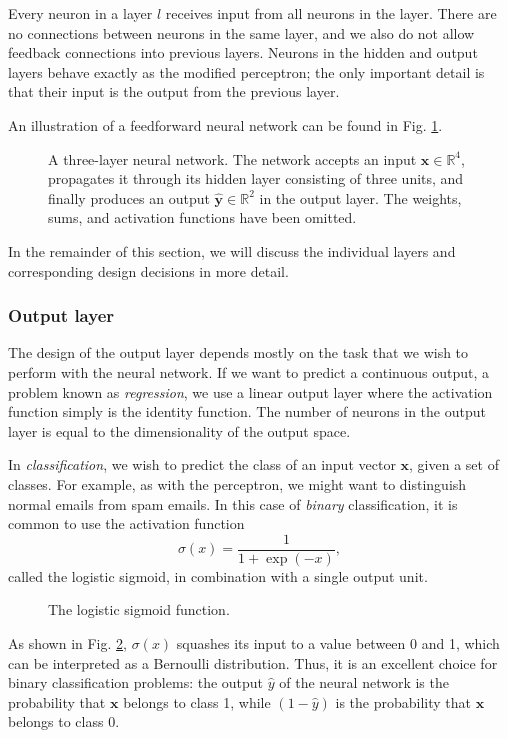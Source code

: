 Every neuron in a layer $l$ receives input from all neurons in the  layer. There are no connections between neurons in the same layer, and we also do not allow feedback connections into previous layers. Neurons in the hidden and output layers behave exactly as the modified perceptron; the only important detail is that their input is the output from the previous layer.

An illustration of a feedforward neural network can be found in Fig. \ref{fig:network}.
\begin{figure}
	\begin{center}
		
	\end{center}
	\caption{A three-layer neural network. The network accepts an input $\bm{x} \in \mathbb{R}^4$, propagates it through its hidden layer consisting of three units, and finally produces an output $\hat{\bm{y}} \in \mathbb{R}^2$ in the output layer. The weights, sums, and activation functions have been omitted.}
	\label{fig:network}
\end{figure}

In the remainder of this section, we will discuss the individual layers and corresponding design decisions in more detail.

\subsubsection{Output layer}
The design of the output layer depends mostly on the task that we wish to perform with the neural network. If we want to predict a continuous output, a problem known as \emph{regression}, we use a linear output layer where the activation function simply is the identity function. The number of neurons in the output layer is equal to the dimensionality of the output space.

In \emph{classification}, we wish to predict the class of an input vector $\bm{x}$, given a set of classes. For example, as with the perceptron, we might want to distinguish normal emails from spam emails. In this case of \emph{binary} classification, it is common to use the activation function
\begin{equation}
\sigma(x) = \frac1{1+\exp(-x)},
\end{equation}
called the logistic sigmoid, in combination with a single output unit.
\begin{figure}
	\begin{center}
		
	\end{center}
	\caption{The logistic sigmoid function.}
	\label{fig:sigmoid}
\end{figure}
As shown in Fig. \ref{fig:sigmoid}, $\sigma(x)$ squashes its input to a value between 0 and 1, which can be interpreted as a Bernoulli distribution. Thus, it is an excellent choice for binary classification problems: the output $\hat{y}$ of the neural network is the probability that $\bm{x}$ belongs to class 1, while $(1-\hat{y})$ is the probability that $\bm{x}$ belongs to class 0.

